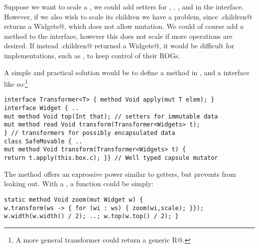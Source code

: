 Suppose we want to scale a \Q@Widget@, we could add \Q@mut@ setters for \Q@width@, \Q@height@, \Q@left@, and \Q@top@ in the \Q@Widget@ interface. However, if we also wish to scale its children we have a problem, since \Q@Widget.children@ returns a \Q@read Widgets@, which does not allow mutation. We could of course add a \Q@mut@ method \Q@zoom@ to the \Q@Widget@ interface, however this does not scale if more operations are desired. If instead \Q@Widget.children@ returned a \Q@mut Widgets@, it would be difficult for \Q@Widget@ implementations, such as \Q@SafeMovable@, to keep control of their ROGs.


A simple and practical solution would be to define a \Q@transform@ method in \Q@Widget@, and a \Q@Transformer@ interface 
like so:\footnote{A more general transformer could return a generic \Q@read R@.}
\begin{lstlisting}
interface Transformer<T> { method Void apply(mut T elem); }
interface Widget { ..
mut method Void top(Int that); // setters for immutable data
mut method read Void transform(Transformer<Widgets> t);
} // transformers for possibly encapsulated data
class SafeMovable { ..
mut method Void transform(Transformer<Widgets> t) {
return t.apply(this.box.c); }} // Well typed capsule mutator
\end{lstlisting}\saveSpace
The \Q@transform@ method offers an expressive power similar to \Q@mut@ getters, but prevents \Q@Widgets@ from leaking out.  With a \Q@Transformer@, a \Q@zoom@ function could be simply:
\begin{lstlisting}
static method Void zoom(mut Widget w) {
w.transform(ws -> { for (wi : ws) { zoom(wi,scale); }});
w.width(w.width() / 2); ..; w.top(w.top() / 2); }
\end{lstlisting}

